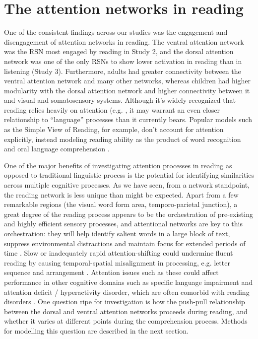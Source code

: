 \section{The attention networks in reading}

One of the consistent findings across our studies was the engagement and disengagement of attention networks in reading. The ventral attention network was the RSN most engaged by reading in Study 2, and the dorsal attention network was one of the only RSNs to show lower activation in reading than in listening (Study 3). Furthermore, adults had greater connectivity between the ventral attention network and many other networks, whereas children had higher modularity with the dorsal attention network and higher connectivity between it and visual and somatosensory systems. Although it's widely recognized that reading relies heavily on attention (e.g. \citep{Vogel2012a, Vidyasagar2010, Clifton2016}, it may warrant an even closer relationship to ``language'' processes than it currently bears. Popular models such as the Simple View of Reading, for example, don't account for attention explicitly, instead modeling reading ability as the product of word recognition and oral language comprehension \citep{Gough1986}. 

One of the major benefits of investigating attention processes in reading as opposed to traditional linguistic process is the potential for identifying similarities across multiple cognitive processes. As we have seen, from a network standpoint, the reading network is less unique than might be expected. Apart from a few remarkable regions (the visual word form area, temporo-parietal junction), a great degree of the reading process appears to be the orchestration of pre-existing and highly efficient sensory processes, and attentional networks are key to this orchestration: they will help identify salient words in a large block of text, suppress environmental distractions and maintain focus for extended periods of time \citep{Fedorenko2014}. Slow or inadequately rapid attention-shifting could undermine fluent reading by causing temporal-spatial misalignment in processing, e.g. letter sequence and arrangement \citep{Lallier2009}. Attention issues such as these could affect performance in other cognitive domains such as specific language impairment and attention deficit / hyperactivity disorder, which are often comorbid with reading disorders \citep{Pennington2006, Margari2013}. One question ripe for investigation is how the push-pull relationship between the dorsal and ventral attention networks proceeds during reading, and whether it varies at different points during the comprehension process. Methods for modelling this question are described in the next section.


